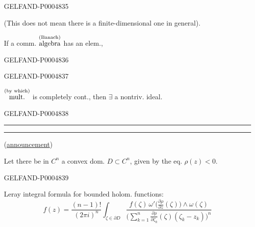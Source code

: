 \begin{GelfandAdjacentEvidence}{GELFAND-P000483}{5}


(This does not mean there is a finite-dimensional one in general).

If a comm. $\overset{\text{\scriptsize (Banach)}}{\text{algebra}}$ has an elem.,
\end{GelfandAdjacentEvidence}
\begin{GelfandAdjacentEvidence}{GELFAND-P000483}{6}

\end{GelfandAdjacentEvidence}
\begin{GelfandAdjacentEvidence}{GELFAND-P000483}{7}

$\overset{\text{\scriptsize (by which)}}{\text{mult.}}$
is completely cont., then $\exists$ a nontriv. ideal.
\end{GelfandAdjacentEvidence}
\begin{GelfandAdjacentEvidence}{GELFAND-P000483}{8}


{\centering\rule{2.1em}{.4pt}\quad\textperiodcentered\quad\rule{2.5em}{.4pt}\par}

\enspace(\uline{announcement})

Let there be in $C^n$ a convex dom. $D\subset C^n$, given by the eq. $\rho(z)<0$.
\end{GelfandAdjacentEvidence}
\begin{GelfandAdjacentEvidence}{GELFAND-P000483}{9}


Leray integral formula for bounded holom. functions:
\[
f(z)=\frac{(n-1)!}{(2\pi i)^n}
\int_{\zeta\in\partial D}
\frac{f(\zeta)\,\omega'\bigl(\frac{\partial\rho}{\partial z}(\zeta)\bigr)
\wedge\omega(\zeta)}
{\bigl(\displaystyle\sum_{k=1}^n
\frac{\partial\rho}{\partial\zeta_k}(\zeta)(\zeta_k-z_k)\bigr)^n}
\]
\end{GelfandAdjacentEvidence}
